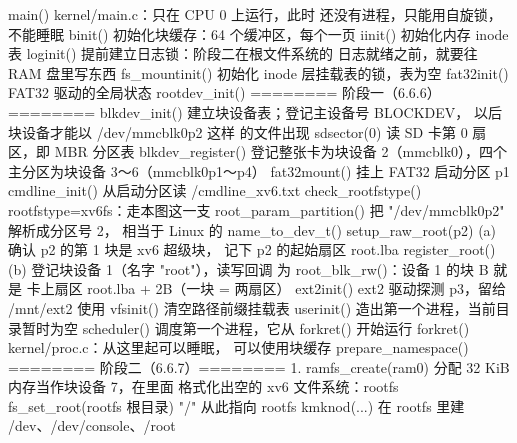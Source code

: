 \begin{txtcode}
main()                                 kernel/main.c：只在 CPU 0 上运行，此时
                                       还没有进程，只能用自旋锁，不能睡眠
  binit()                              初始化块缓存：64 个缓冲区，每个一页
  iinit()                              初始化内存 inode 表
    loginit()                          提前建立日志锁：阶段二在根文件系统的
                                       日志就绪之前，就要往 RAM 盘里写东西
    fs_mountinit()                     初始化 inode 层挂载表的锁，表为空
  fat32init()                          FAT32 驱动的全局状态
  rootdev_init()                       ======== 阶段一（6.6.6）========
    blkdev_init()                      建立块设备表；登记主设备号 BLOCKDEV，
                                       以后块设备才能以 /dev/mmcblk0p2 这样
                                       的文件出现
    sdsector(0)                        读 SD 卡第 0 扇区，即 MBR 分区表
    blkdev_register()                  登记整张卡为块设备 2（mmcblk0），四个
                                       主分区为块设备 3～6（mmcblk0p1～p4）
    fat32mount()                       挂上 FAT32 启动分区 p1
    cmdline_init()                     从启动分区读 /cmdline_xv6.txt
    check_rootfstype()                 rootfstype=xv6fs：走本图这一支
    root_param_partition()             把 "/dev/mmcblk0p2" 解析成分区号 2，
                                       相当于 Linux 的 name_to_dev_t()
    setup_raw_root(p2)            (a)  确认 p2 的第 1 块是 xv6 超级块，
                                       记下 p2 的起始扇区 root.lba
    register_root()               (b)  登记块设备 1（名字 "root"），读写回调
                                       为 root_blk_rw()：设备 1 的块 B 就是
                                       卡上扇区 root.lba + 2B（一块 = 两扇区）
  ext2init()                           ext2 驱动探测 p3，留给 /mnt/ext2 使用
  vfsinit()                            清空路径前缀挂载表
  userinit()                           造出第一个进程，当前目录暂时为空
  scheduler()                          调度第一个进程，它从 forkret() 开始运行
forkret()                              kernel/proc.c：从这里起可以睡眠，
                                       可以使用块缓存
  prepare_namespace()                  ======== 阶段二（6.6.7）========
    1. ramfs_create(ram0)              分配 32 KiB 内存当作块设备 7，在里面
                                       格式化出空的 xv6 文件系统：rootfs
       fs_set_root(rootfs 根目录)      "/" 从此指向 rootfs
       kmknod(...)                     在 rootfs 里建 /dev、/dev/console、/root

\end{txtcode}
